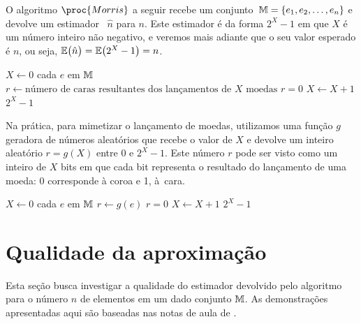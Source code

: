 O algoritmo $\proc{Morris}$ a seguir recebe um conjunto~$\mathbb{M} = \{ e_1, e_2, \dots, e_n \}$ e devolve um estimador~
$\hat{n}$ para $n$. Este estimador é da forma $2^{X} - 1$ em que $X$ é um número inteiro não negativo, e veremos mais 
adiante que o seu valor esperado é $n$, ou seja, $\mathbb{E}\big(\hat{n}\big) = \mathbb{E}\big(2^{X} - 1\big) = n$.

\begin{codebox}
  \li $X \gets 0$
  \li \For cada $e$ em $\mathbb{M}$ 
  \li \Do
      $r \gets \text{número de caras resultantes dos lançamentos de $X$ moedas}$ 
  \li   \If $r = 0$
  \li   \Do
          $X \gets X + 1$
        \End
      \End
  \li
  \Return $2^{X} - 1$   
  \End
\end{codebox}

Na prática, para mimetizar o lançamento de moedas, utilizamos uma função $g$ geradora de números aleatórios que recebe o
valor de $X$ e devolve um inteiro aleatório $r = g(X)$ entre 0 e $2^{X} - 1$. Este número $r$ pode ser visto como um 
inteiro de $X$ bits em que cada bit representa o resultado do lançamento de uma moeda: 0 corresponde à coroa e 1, 
à~cara. 

\begin{codebox}
  \li $X \gets 0$                                         \label{li:morris:init}
  \li \For cada $e$ em $\mathbb{M}$                             \label{li:morris:for:start}
  \li \Do
      $r \gets g(e)$                                      \label{li:morris:generator}
  \li   \If $r = 0$                                       \label{li:morris:increment:condition}
  \li   \Do
          $X \gets X + 1$
        \End
      \End                                                \label{li:morris:end}
  \li
  \Return $2^{X} - 1$                                     \label{li:morris:return}
  \End
\end{codebox}

\section{Qualidade da aproximação}
\label{sec:morris:analysis}
\newcommand{\morrisestimator}{\proc{Morris}(\Mbb)}

Esta seção busca investigar a qualidade do estimador devolvido pelo algoritmo  para o número $n$ de 
elementos em um dado conjunto $\mathbb{M}$. As demonstrações apresentadas aqui são baseadas nas notas de aula de 
\citep{LectureNotesAndoni}.

